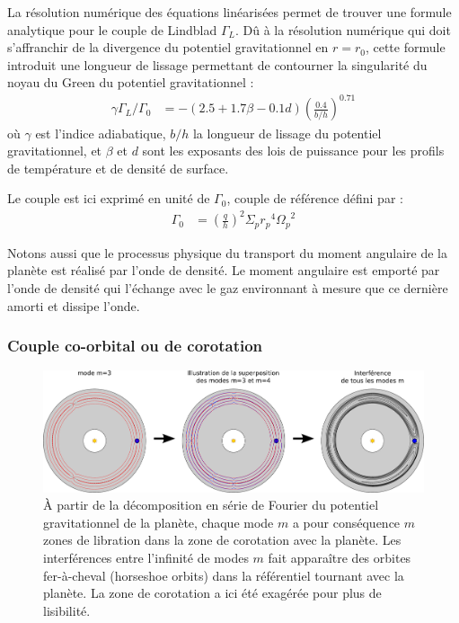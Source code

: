 La résolution numérique des équations linéarisées permet de trouver une formule analytique pour le couple de Lindblad $\Gamma_L$. Dû à la résolution numérique qui doit s'affranchir de la divergence du potentiel gravitationnel en $r=r_0$, cette formule introduit une longueur de lissage permettant de contourner la singularité du noyau du Green du potentiel gravitationnel \citep[eq. (14)]{paardekooper2010torque} : 
\begin{align}
\gamma \Gamma_L/\Gamma_0 &= - \left(2.5 +1.7\beta -0.1d\right) \left(\frac{0.4}{b/h}\right)^{0.71}\label{eq:lindblad-torque}
\end{align}
où $\gamma$ est l'indice adiabatique, $b/h$ la longueur de lissage du potentiel gravitationnel, et $\beta$ et $d$ sont les exposants des lois de puissance pour les profils de température et de densité de surface. 

Le couple est ici exprimé en unité de $\Gamma_0$, couple de référence défini par : 
\begin{align}
\Gamma_0 &= \left(\frac{q}{h}\right)^2\Sigma_p {r_p}^4 {\Omega_p}^2
\end{align}

Notons aussi que le processus physique du transport du moment angulaire de la planète est réalisé par l'onde de densité. Le moment angulaire est emporté par l'onde de densité qui l'échange avec le gaz environnant à mesure que ce dernière amorti et dissipe l'onde.

\subsubsection{Couple co-orbital ou de corotation}\label{sec:couple-corotation}
\begin{figure}[htbp]
\centering
\includegraphics[width=\linewidth]{figure/corotation_modes.pdf}
\caption{À partir de la décomposition en série de Fourier du potentiel gravitationnel de la planète, chaque mode $m$ a pour conséquence $m$ zones de libration dans la zone de corotation avec la planète. Les interférences entre l'infinité de modes $m$ fait apparaître des orbites fer-à-cheval (\og horseshoe orbits\fg) dans la référentiel tournant avec la planète. La zone de corotation a ici été exagérée pour plus de lisibilité.}\label{fig:corotation_torque}
\end{figure}

